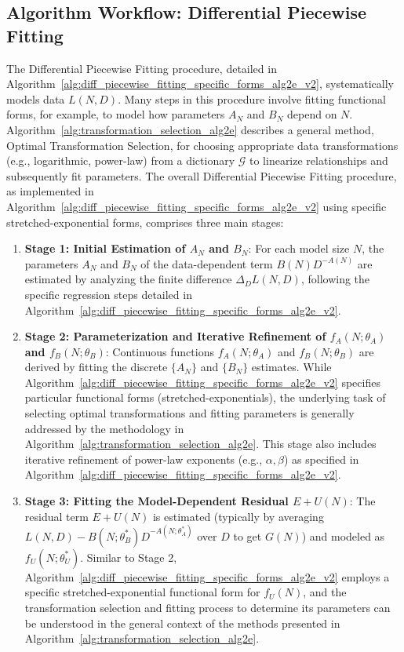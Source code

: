 \documentclass{article}
\begin{document}

\subsection{Algorithm Workflow: Differential Piecewise Fitting}
\label{app:algorithm_workflow}

The Differential Piecewise Fitting procedure, detailed in Algorithm~\ref{alg:diff_piecewise_fitting_specific_forms_alg2e_v2}, systematically models data $L(N,D)$. Many steps in this procedure involve fitting functional forms, for example, to model how parameters $A_N$ and $B_N$ depend on $N$. Algorithm~\ref{alg:transformation_selection_alg2e} describes a general method, Optimal Transformation Selection, for choosing appropriate data transformations (e.g., logarithmic, power-law) from a dictionary $\mathcal{G}$ to linearize relationships and subsequently fit parameters. The overall Differential Piecewise Fitting procedure, as implemented in Algorithm~\ref{alg:diff_piecewise_fitting_specific_forms_alg2e_v2} using specific stretched-exponential forms, comprises three main stages:

\begin{enumerate}
    \item \textbf{Stage 1: Initial Estimation of $A_N$ and $B_N$}: For each model size $N$, the parameters $A_N$ and $B_N$ of the data-dependent term $B(N)D^{-A(N)}$ are estimated by analyzing the finite difference $\Delta_D L(N,D)$, following the specific regression steps detailed in Algorithm~\ref{alg:diff_piecewise_fitting_specific_forms_alg2e_v2}.
    \item \textbf{Stage 2: Parameterization and Iterative Refinement of $f_A(N;\theta_A)$ and $f_B(N;\theta_B)$}: Continuous functions $f_A(N;\theta_A)$ and $f_B(N;\theta_B)$ are derived by fitting the discrete $\{A_N\}$ and $\{B_N\}$ estimates. While Algorithm~\ref{alg:diff_piecewise_fitting_specific_forms_alg2e_v2} specifies particular functional forms (stretched-exponentials), the underlying task of selecting optimal transformations and fitting parameters is generally addressed by the methodology in Algorithm~\ref{alg:transformation_selection_alg2e}. This stage also includes iterative refinement of power-law exponents (e.g., $\alpha, \beta$) as specified in Algorithm~\ref{alg:diff_piecewise_fitting_specific_forms_alg2e_v2}.
    \item \textbf{Stage 3: Fitting the Model-Dependent Residual $E+U(N)$}: The residual term $E+U(N)$ is estimated (typically by averaging $L(N,D) - B(N;\theta_B^*)D^{-A(N;\theta_A^*)}$ over $D$ to get $G(N)$) and modeled as $f_U(N;\theta_U^*)$. Similar to Stage 2, Algorithm~\ref{alg:diff_piecewise_fitting_specific_forms_alg2e_v2} employs a specific stretched-exponential functional form for $f_U(N)$, and the transformation selection and fitting process to determine its parameters can be understood in the general context of the methods presented in Algorithm~\ref{alg:transformation_selection_alg2e}.
\end{enumerate}
\end{document}
